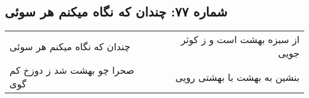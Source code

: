 \begin{center}
\section*{شماره ۷۷: چندان که نگاه میکنم هر سوئی}
\label{sec:077}
\begin{longtable}{l p{0.5cm} r}
چندان که نگاه میکنم هر سوئی
&&
از سبزه بهشت است و ز کوثر جویی
\\
صحرا چو بهشت شد ز دوزخ کم گوی
&&
بنشین به بهشت با بهشتی رویی
\\
\end{longtable}
\end{center}
